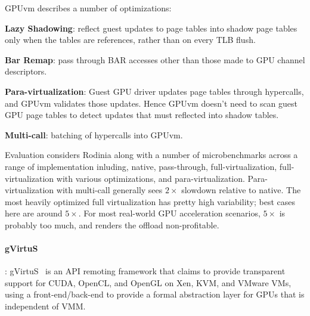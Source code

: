 	  GPUvm describes a number of optimizations:
	  \begin{compactitem}
	  \item {\bf Lazy Shadowing}: reflect guest updates to page tables into shadow page tables
	        only when the tables are references, rather than on every TLB flush.
	  \item {\bf Bar Remap}: pass through BAR accesses other than those made to GPU channel descriptors.
	  \item {\bf Para-virtualization}: Guest GPU driver updates page tables through hypercalls, and GPUvm
	        validates those updates. Hence GPUvm doesn't need to scan guest GPU page tables to detect
			updates that must reflected into shadow tables.
	  \item {\bf Multi-call}: batching of hypercalls into GPUvm.
	  \end{compactitem}

	  Evaluation considers Rodinia along with a number of microbenchmarks across a range of implementation
	  inluding, native, pass-through, full-virtualization, full-virtualization with various optimizations,
	  and para-virtualization. Para-virtualization with multi-call generally sees $2\times$ slowdown relative to
	  native. The most heavily optimized full virtualization has pretty high variability; best cases here are
	  around $5\times$. For most real-world GPU acceleration scenarios, $5\times$ is probably too much, and
	  renders the offload non-profitable.

\paragraph {\bf gVirtuS}: gVirtuS~\cite{gVirtuS} is an API remoting framework that claims to provide
	transparent support for CUDA, OpenCL, and OpenGL on Xen, KVM, and VMware VMs, using a front-end/back-end
	to provide a formal abstraction layer for GPUs that is independent of VMM.

